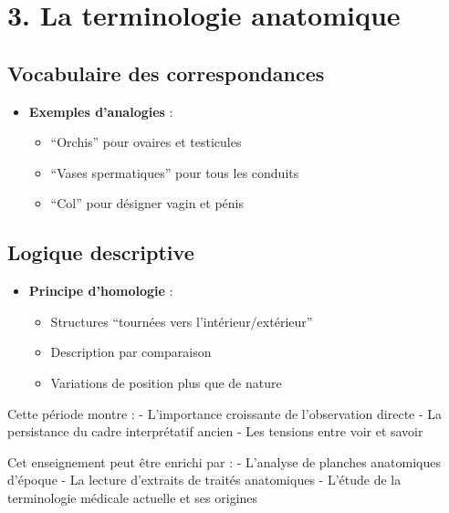 \documentclass[
  letterpaper,
  DIV=11,
  numbers=noendperiod]{scrreprt}
\providecommand{\tightlist}{%
  \setlength{\itemsep}{0pt}\setlength{\parskip}{0pt}}\usepackage{longtable,booktabs,array}
\begin{document}
\section{3. La terminologie
anatomique}\label{la-terminologie-anatomique}

\subsection{Vocabulaire des
correspondances}\label{vocabulaire-des-correspondances}

\begin{itemize}
\tightlist
\item
  \textbf{Exemples d'analogies} :

  \begin{itemize}
  \tightlist
  \item
    ``Orchis'' pour ovaires et testicules
  \item
    ``Vases spermatiques'' pour tous les conduits
  \item
    ``Col'' pour désigner vagin et pénis
  \end{itemize}
\end{itemize}

\subsection{Logique descriptive}\label{logique-descriptive}

\begin{itemize}
\tightlist
\item
  \textbf{Principe d'homologie} :

  \begin{itemize}
  \tightlist
  \item
    Structures ``tournées vers l'intérieur/extérieur''
  \item
    Description par comparaison
  \item
    Variations de position plus que de nature
  \end{itemize}
\end{itemize}

Cette période montre : - L'importance croissante de l'observation
directe - La persistance du cadre interprétatif ancien - Les tensions
entre voir et savoir

Cet enseignement peut être enrichi par : - L'analyse de planches
anatomiques d'époque - La lecture d'extraits de traités anatomiques -
L'étude de la terminologie médicale actuelle et ses origines
\end{document}
